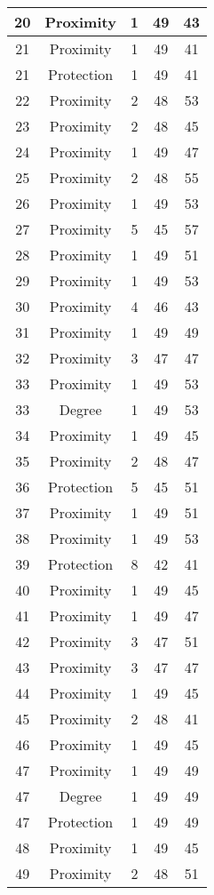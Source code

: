\documentclass[results.tex]{subfiles}
\begin{document}
\begin{center}
\begin{tabular}{| c || c | c | c | c |}
    \hline
    20 & Proximity & 1 & 49 & 43 \\ 
    \hline
    21 & Proximity & 1 & 49 & 41 \\ 
    \hline
    21 & Protection & 1 & 49 & 41 \\ 
    \hline
    22 & Proximity & 2 & 48 & 53 \\ 
    \hline
    23 & Proximity & 2 & 48 & 45 \\ 
    \hline
    24 & Proximity & 1 & 49 & 47 \\ 
    \hline
    25 & Proximity & 2 & 48 & 55 \\ 
    \hline
    26 & Proximity & 1 & 49 & 53 \\ 
    \hline
    27 & Proximity & 5 & 45 & 57 \\ 
    \hline
    28 & Proximity & 1 & 49 & 51 \\ 
    \hline
    29 & Proximity & 1 & 49 & 53 \\ 
    \hline
    30 & Proximity & 4 & 46 & 43 \\ 
    \hline
    31 & Proximity & 1 & 49 & 49 \\ 
    \hline
    32 & Proximity & 3 & 47 & 47 \\ 
    \hline
    33 & Proximity & 1 & 49 & 53 \\ 
    \hline
    33 & Degree & 1 & 49 & 53 \\ 
    \hline
    34 & Proximity & 1 & 49 & 45 \\ 
    \hline
    35 & Proximity & 2 & 48 & 47 \\ 
    \hline
    36 & Protection & 5 & 45 & 51 \\ 
    \hline
    37 & Proximity & 1 & 49 & 51 \\ 
    \hline
    38 & Proximity & 1 & 49 & 53 \\ 
    \hline
    39 & Protection & 8 & 42 & 41 \\ 
    \hline
    40 & Proximity & 1 & 49 & 45 \\ 
    \hline
    41 & Proximity & 1 & 49 & 47 \\ 
    \hline
    42 & Proximity & 3 & 47 & 51 \\ 
    \hline
    43 & Proximity & 3 & 47 & 47 \\ 
    \hline
    44 & Proximity & 1 & 49 & 45 \\ 
    \hline
    45 & Proximity & 2 & 48 & 41 \\ 
    \hline
    46 & Proximity & 1 & 49 & 45 \\ 
    \hline
    47 & Proximity & 1 & 49 & 49 \\ 
    \hline
    47 & Degree & 1 & 49 & 49 \\ 
    \hline
    47 & Protection & 1 & 49 & 49 \\ 
    \hline
    48 & Proximity & 1 & 49 & 45 \\ 
    \hline
    49 & Proximity & 2 & 48 & 51 \\ 
    \hline   \end{tabular}
\end{center}
\end{document}
